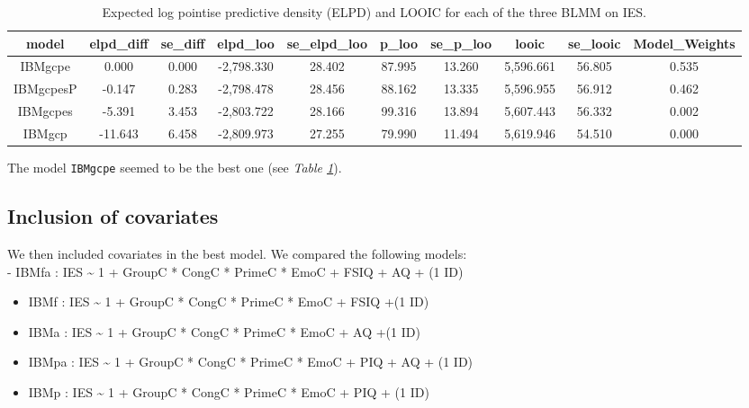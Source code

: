 \documentclass[
  11pt,
  english,
  ,doc,floatsintext]{apa6}
\begin{document}
\begin{table}[htb]

\begin{center}
\begin{threeparttable}

\caption{\label{tab:modelCompIES1}Expected log pointise predictive density (ELPD) and LOOIC for each of the three BLMM on IES.}

\tiny{

\begin{tabular}{cccccccccc}
\toprule
model & \multicolumn{1}{c}{elpd\_diff} & \multicolumn{1}{c}{se\_diff} & \multicolumn{1}{c}{elpd\_loo} & \multicolumn{1}{c}{se\_elpd\_loo} & \multicolumn{1}{c}{p\_loo} & \multicolumn{1}{c}{se\_p\_loo} & \multicolumn{1}{c}{looic} & \multicolumn{1}{c}{se\_looic} & \multicolumn{1}{c}{Model\_Weights}\\
\midrule
IBMgcpe & 0.000 & 0.000 & -2,798.330 & 28.402 & 87.995 & 13.260 & 5,596.661 & 56.805 & 0.535\\
IBMgcpesP & -0.147 & 0.283 & -2,798.478 & 28.456 & 88.162 & 13.335 & 5,596.955 & 56.912 & 0.462\\
IBMgcpes & -5.391 & 3.453 & -2,803.722 & 28.166 & 99.316 & 13.894 & 5,607.443 & 56.332 & 0.002\\
IBMgcp & -11.643 & 6.458 & -2,809.973 & 27.255 & 79.990 & 11.494 & 5,619.946 & 54.510 & 0.000\\
\bottomrule
\end{tabular}

}

\end{threeparttable}
\end{center}

\end{table}

The model \texttt{IBMgcpe} seemed to be the best one (see \emph{Table \ref{tab:modelCompIES1}}).

\hypertarget{inclusion-of-covariates}{%
\subsection{Inclusion of covariates}\label{inclusion-of-covariates}}

We then included covariates in the best model. We compared the following models:\\
- IBMfa : IES \textasciitilde{} 1 + GroupC * CongC * PrimeC * EmoC + FSIQ + AQ + (1 \textbar{} ID)

\begin{itemize}
\item
  IBMf : IES \textasciitilde{} 1 + GroupC * CongC * PrimeC * EmoC + FSIQ +(1 \textbar{} ID)
\item
  IBMa : IES \textasciitilde{} 1 + GroupC * CongC * PrimeC * EmoC + AQ +(1 \textbar{} ID)
\item
  IBMpa : IES \textasciitilde{} 1 + GroupC * CongC * PrimeC * EmoC + PIQ + AQ + (1 \textbar{} ID)
\item
  IBMp : IES \textasciitilde{} 1 + GroupC * CongC * PrimeC * EmoC + PIQ + (1 \textbar{} ID)
\end{itemize}
\end{document}
